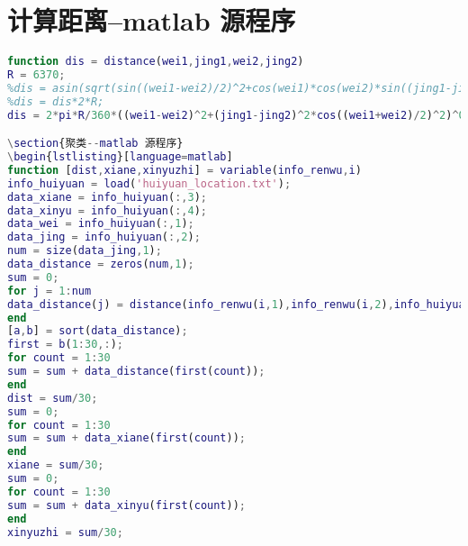 \documentclass[withoutpreface,bwprint]{cumcmthesis} %
\begin{document}
\section{计算距离--matlab 源程序}
\begin{lstlisting}[language=matlab]
function dis = distance(wei1,jing1,wei2,jing2)
R = 6370;
%dis = asin(sqrt(sin((wei1-wei2)/2)^2+cos(wei1)*cos(wei2)*sin((jing1-jing2)/2)^2));
%dis = dis*2*R;
dis = 2*pi*R/360*((wei1-wei2)^2+(jing1-jing2)^2*cos((wei1+wei2)/2)^2)^0.5;

\section{聚类--matlab 源程序}
\begin{lstlisting}[language=matlab]
function [dist,xiane,xinyuzhi] = variable(info_renwu,i)
info_huiyuan = load('huiyuan_location.txt');
data_xiane = info_huiyuan(:,3);
data_xinyu = info_huiyuan(:,4);
data_wei = info_huiyuan(:,1);
data_jing = info_huiyuan(:,2);
num = size(data_jing,1);
data_distance = zeros(num,1);
sum = 0;
for j = 1:num
data_distance(j) = distance(info_renwu(i,1),info_renwu(i,2),info_huiyuan(j,1),info_huiyuan(j,2));
end
[a,b] = sort(data_distance);
first = b(1:30,:);
for count = 1:30
sum = sum + data_distance(first(count));
end
dist = sum/30;
sum = 0;
for count = 1:30
sum = sum + data_xiane(first(count));
end
xiane = sum/30;
sum = 0;
for count = 1:30
sum = sum + data_xinyu(first(count));
end
xinyuzhi = sum/30;

\end{lstlisting}
\end{document}
